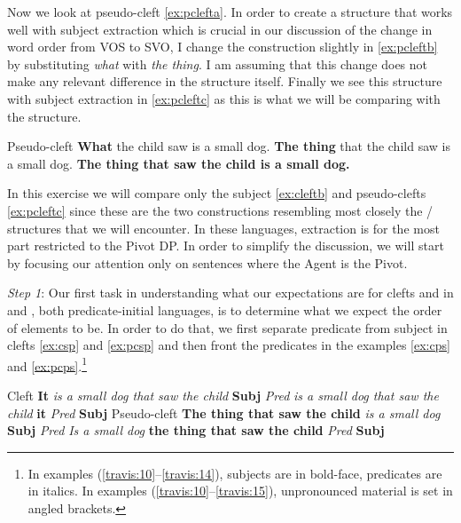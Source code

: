 \documentclass[output=paper]{langsci/langscibook}
\begin{document}
Now we look at pseudo-cleft \eqref{ex:pclefta}.  In order to create a structure
that works well with subject extraction which is crucial in our discussion of
the change in word order from VOS to SVO, I change the construction slightly in
\eqref{ex:pcleftb} by substituting \emph{what} with \emph{the thing}.  I am
assuming that this change does not make any relevant difference in the
structure itself.  Finally we see this structure with subject extraction in
\eqref{ex:pcleftc} as this is what we will be comparing with the 
structure.

\ea  Pseudo-cleft
    \ea \textbf{What} the child saw is a small dog.\label{ex:pclefta}
    \ex \textbf{The thing} that the child saw is a small dog. \label{ex:pcleftb}
    \ex \textbf{The thing that saw the child is a small dog.\label{ex:pcleftc}}
    \z
\z

In this exercise we will compare only the subject  \eqref{ex:cleftb} and
pseudo-clefts \eqref{ex:pcleftc} since these are the two constructions resembling
most closely the / structures that we will encounter.  In these
languages, extraction is for the most part restricted to the Pivot DP.  In
order to simplify the discussion, we will start by focusing our attention only
on sentences where the Agent is the Pivot.

\textit{Step 1}:  Our first task in understanding what our expectations are for
clefts and  in  and , both predicate-initial
languages, is to determine what we expect the order of elements to be.  In
order to do that, we first separate predicate from subject in clefts
\eqref{ex:csp} and  \eqref{ex:pcsp} and then front the
predicates in the  examples \eqref{ex:cps} and
\eqref{ex:pcps}.\footnote{In examples
(\ref{travis:10}--\ref{travis:14}), subjects are in bold-face, predicates are
in italics. In examples (\ref{travis:10}--\ref{travis:15}), unpronounced
material is set in angled brackets.}\largerpage[1.5]

\ea\label{travis:10} Cleft
    \ea \textbf{It}  \emph{is a small dog that saw the child}\label{ex:csp} \hfill \textbf{Subj} \emph{Pred}
     \ex \emph{is a small dog that saw the child } \textbf{it}\label{ex:cps} \hfill \emph{Pred} \textbf{Subj}
    \z
\ex  Pseudo-cleft
    \ea  \textbf{The thing that saw the child }  \emph{is a small dog}\label{ex:pcsp} \hfill \textbf{Subj} \emph{Pred}
     \ex \emph{Is a small dog} \textbf{the thing that saw the child} \label{ex:pcps} \hfill \emph{Pred} \textbf{Subj}
    \z
\z
\end{document}
